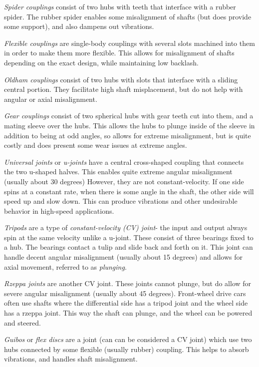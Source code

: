 \documentclass[10pt,letterpaper]{book}
\begin{document}
	\begin{asparaenum}[a)]
		\item \textit{Spider couplings} consist of two hubs with teeth that interface with a rubber spider. The rubber spider enables some misalignment of shafts (but does provide some support), and also dampens out vibrations.
		\item \textit{Flexible couplings} are single-body couplings with several slots machined into them in order to make them more flexible. This allows for misalignment of shafts depending on the exact design, while maintaining low backlash.
		\item \textit{Oldham couplings} consist of two hubs with slots that interface with a sliding central portion. They facilitate high shaft misplacement, but do not help with angular or axial misalignment.
		\item \textit{Gear couplings} consist of two spherical hubs with gear teeth cut into them, and a mating sleeve over the hubs. This allows the hubs to plunge inside of the sleeve in addition to being at odd angles, so allows for extreme misalignment, but is quite costly and does present some wear issues at extreme angles.
		\item \textit{Universal joints} or \textit{u-joints} have a central cross-shaped coupling that connects the two u-shaped halves. This enables quite extreme angular misalignment (usually about 30 degrees) However, they are not constant-velocity. If one side spins at a constant rate, when there is some angle in the shaft, the other side will speed up and slow down. This can produce vibrations and other undesirable behavior in high-speed applications.
		\item \textit{Tripods} are a type of \textit{constant-velocity (CV) joint}- the input and output always spin at the same velocity unlike a u-joint. These consist of three bearings fixed to a hub. The bearings contact a tulip and slide back and forth on it. This joint can handle decent angular misalignment (usually about 15 degrees) and allows for axial movement, referred to as \textit{plunging}.
		\item \textit{Rzeppa joints} are another CV joint. These joints cannot plunge, but do allow for severe angular misalignment (usually about 45 degrees). Front-wheel drive cars often use shafts where the differential side has a tripod joint and the wheel side has a rzeppa joint. This way the shaft can plunge, and the wheel can be powered and steered.
		\item \textit{Guibos} or \textit{flex discs} are a joint (can can be considered a CV joint) which use two hubs connected by some flexible (usually rubber) coupling. This helps to absorb vibrations, and handles shaft misalignment.
	\end{asparaenum}
\end{document}
